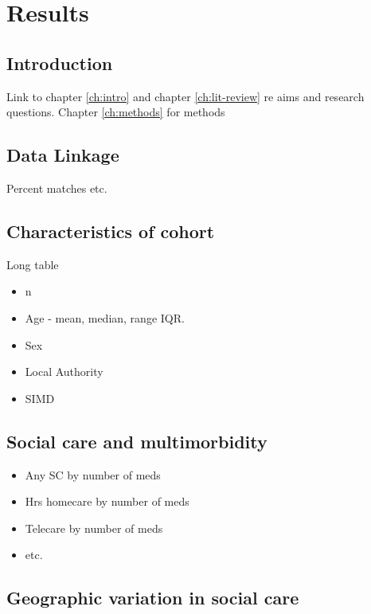 \documentclass[12pt,]{report}
\begin{document}
\FloatBarrier
\newpage
{}

\chapter{Results}\label{ch:results}

\section{Introduction}\label{sec:social-care-intro}

Link to chapter \ref{ch:intro} and chapter \ref{ch:lit-review} re aims
and research questions. Chapter \ref{ch:methods} for methods

\section{Data Linkage}\label{sec:res-linkage}

Percent matches etc.

\section{Characteristics of cohort}

Long table

\begin{itemize}[noitemsep]
\item n
\item Age - mean, median, range IQR.
\item Sex
\item Local Authority
\item SIMD
\end{itemize}

\section{Social care and multimorbidity}\label{sec:sc-mm}

\begin{itemize}[noitemsep]
\item Any SC by number of meds
\item Hrs homecare by number of meds
\item Telecare by number of meds
\item etc.
\end{itemize}

\section{Geographic variation in social care}
\end{document}

